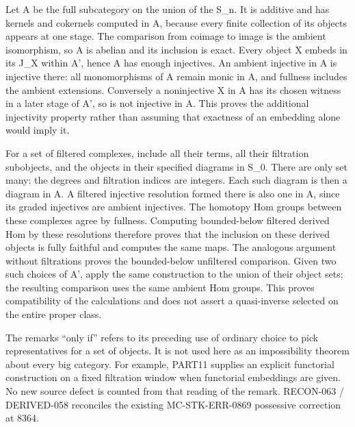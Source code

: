 Let A\textquotesingle{} be the full subcategory on the union of the S\_\allowbreak{}n. It is additive and has kernels and cokernels computed in A,\allowbreak{} because every finite collection of its objects appears at one stage. The comparison from coimage to image is the ambient isomorphism,\allowbreak{} so A\textquotesingle{} is abelian and its inclusion is exact. Every object X embeds in its J\_\allowbreak{}X within A',\allowbreak{} hence A\textquotesingle{} has enough injectives. An ambient injective in A\textquotesingle{} is injective there:\allowbreak{} all monomorphisms of A\textquotesingle{} remain monic in A,\allowbreak{} and fullness includes the ambient extensions. Conversely a noninjective X in A\textquotesingle{} has its chosen witness in a later stage of A',\allowbreak{} so is not injective in A\textquotesingle. This proves the additional injectivity property rather than assuming that exactness of an embedding alone would imply it.

For a set of filtered complexes,\allowbreak{} include all their terms,\allowbreak{} all their filtration subobjects,\allowbreak{} and the objects in their specified diagrams in S\_\allowbreak{}0. There are only set many:\allowbreak{} the degrees and filtration indices are integers. Each such diagram is then a diagram in A\textquotesingle. A filtered injective resolution formed there is also one in A,\allowbreak{} since its graded injectives are ambient injectives. The homotopy Hom groups between these complexes agree by fullness. Computing bounded-below filtered derived Hom by these resolutions therefore proves that the inclusion on these derived objects is fully faithful and computes the same maps. The analogous argument without filtrations proves the bounded-below unfiltered comparison. Given two such choices of A',\allowbreak{} apply the same construction to the union of their object sets; the resulting comparison uses the same ambient Hom groups. This proves compatibility of the calculations and does not assert a quasi-inverse selected on the entire proper class.

The remark\textquotesingle s ``only if'' refers to its preceding use of ordinary choice to pick representatives for a set of objects. It is not used here as an impossibility theorem about every big category. For example,\allowbreak{} PART11 supplies an explicit functorial construction on a fixed filtration window when functorial embeddings are given. No new source defect is counted from that reading of the remark. RECON-063 /\allowbreak{} DERIVED-058 reconciles the existing MC-STK-ERR-0869 possessive correction at 8364.

